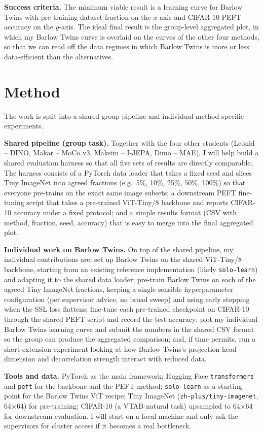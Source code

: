 \documentclass[english, a4paper]{article}
\begin{document}
\textbf{Success criteria.} The minimum viable result is a learning curve for Barlow Twins with pre-training dataset fraction on the $x$-axis and CIFAR-10 PEFT accuracy on the $y$-axis. The ideal final result is the group-level aggregated plot, in which my Barlow Twins curve is overlaid on the curves of the other four methods, so that we can read off the data regimes in which Barlow Twins is more or less data-efficient than the alternatives.

\section*{Method}
The work is split into a shared group pipeline and individual method-specific experiments.

\textbf{Shared pipeline (group task).} Together with the four other students (Leonid -- DINO, Makar -- MoCo v3, Maksim -- I-JEPA, Dimo -- MAE), I will help build a shared evaluation harness so that all five sets of results are directly comparable. The harness consists of a PyTorch data loader that takes a fixed seed and slices Tiny ImageNet into agreed fractions (e.g.\ 5\%, 10\%, 25\%, 50\%, 100\%) so that everyone pre-trains on the exact same image subsets; a downstream PEFT fine-tuning script that takes a pre-trained ViT-Tiny/8 backbone and reports CIFAR-10 accuracy under a fixed protocol; and a simple results format (CSV with method, fraction, seed, accuracy) that is easy to merge into the final aggregated plot.

\textbf{Individual work on Barlow Twins.} On top of the shared pipeline, my individual contributions are: set up Barlow Twins on the shared ViT-Tiny/8 backbone, starting from an existing reference implementation (likely \texttt{solo-learn}) and adapting it to the shared data loader; pre-train Barlow Twins on each of the agreed Tiny ImageNet fractions, keeping a single sensible hyperparameter configuration (per supervisor advice, no broad sweep) and using early stopping when the SSL loss flattens; fine-tune each pre-trained checkpoint on CIFAR-10 through the shared PEFT script and record the test accuracy; plot my individual Barlow Twins learning curve and submit the numbers in the shared CSV format so the group can produce the aggregated comparison; and, if time permits, run a short extension experiment looking at how Barlow Twins's projection-head dimension and decorrelation strength interact with reduced data.

\textbf{Tools and data.} PyTorch as the main framework; Hugging Face \texttt{transformers} and \texttt{peft} for the backbone and the PEFT method; \texttt{solo-learn} as a starting point for the Barlow Twins ViT recipe; Tiny ImageNet (\texttt{zh-plus/tiny-imagenet}, 64$\times$64) for pre-training; CIFAR-10 (a VTAB-natural task) upsampled to 64$\times$64 for downstream evaluation. I will start on a local machine and only ask the supervisors for cluster access if it becomes a real bottleneck.
\end{document}
